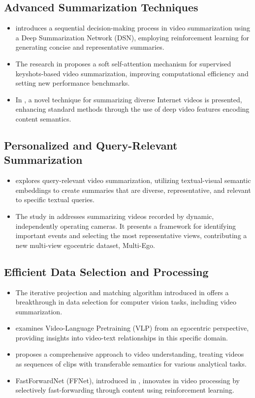 \documentclass{ieeeaccess}
\begin{document}
\subsection{Advanced Summarization Techniques}
\begin{itemize}
    \item \cite{ref1} introduces a sequential decision-making process in video summarization using a Deep Summarization Network (DSN), employing reinforcement learning for generating concise and representative summaries.
    \item The research in \cite{ref2} proposes a soft self-attention mechanism for supervised keyshots-based video summarization, improving computational efficiency and setting new performance benchmarks.
    \item In \cite{ref3}, a novel technique for summarizing diverse Internet videos is presented, enhancing standard methods through the use of deep video features encoding content semantics.
\end{itemize}

\subsection{Personalized and Query-Relevant Summarization}
\begin{itemize}
    \item \cite{ref7} explores query-relevant video summarization, utilizing textual-visual semantic embeddings to create summaries that are diverse, representative, and relevant to specific textual queries.
    \item The study in \cite{ref9} addresses summarizing videos recorded by dynamic, independently operating cameras. It presents a framework for identifying important events and selecting the most representative views, contributing a new multi-view egocentric dataset, Multi-Ego.
\end{itemize}

\subsection{Efficient Data Selection and Processing}
\begin{itemize}
    \item The iterative projection and matching algorithm introduced in \cite{ref4} offers a breakthrough in data selection for computer vision tasks, including video summarization.
    \item \cite{ref5} examines Video-Language Pretraining (VLP) from an egocentric perspective, providing insights into video-text relationships in this specific domain.
    \item \cite{ref6} proposes a comprehensive approach to video understanding, treating videos as sequences of clips with transferable semantics for various analytical tasks.
    \item FastForwardNet (FFNet), introduced in \cite{ref8}, innovates in video processing by selectively fast-forwarding through content using reinforcement learning.
\end{itemize}
\end{document}
